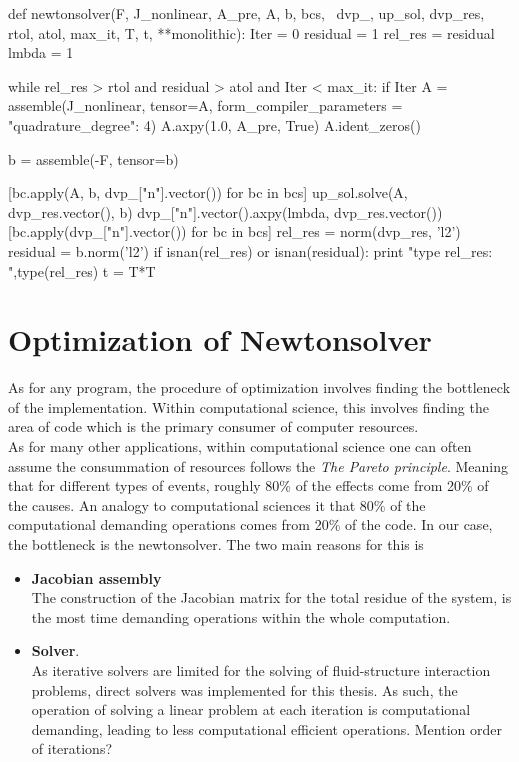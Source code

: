 \begin{python}[caption=newtonsolver.py]
def newtonsolver(F, J_nonlinear, A_pre, A, b, bcs, \
              dvp_, up_sol, dvp_res, rtol, atol, max_it, T, t, **monolithic):
    Iter      = 0
    residual   = 1
    rel_res    = residual
    lmbda = 1

    while rel_res > rtol and residual > atol and Iter < max_it:
        if Iter %
            A = assemble(J_nonlinear, tensor=A, form_compiler_parameters = {"quadrature_degree": 4}) 
            A.axpy(1.0, A_pre, True)
            A.ident_zeros()

        b = assemble(-F, tensor=b)

        [bc.apply(A, b, dvp_["n"].vector()) for bc in bcs]
        up_sol.solve(A, dvp_res.vector(), b)
        dvp_["n"].vector().axpy(lmbda, dvp_res.vector())
        [bc.apply(dvp_["n"].vector()) for bc in bcs]
        rel_res = norm(dvp_res, 'l2')
        residual = b.norm('l2')
        if isnan(rel_res) or isnan(residual):
            print "type rel_res: ",type(rel_res)
            t = T*T

\end{python}
\section{Optimization of Newtonsolver}
As for any program, the procedure of optimization involves finding the bottleneck of the implementation. Within computational science, this involves finding the area of code which is the primary consumer of computer resources. \\
As for many other applications, within computational science one can often assume the consummation of resources follows the \textit{The Pareto principle}. Meaning that for different types of events, roughly 80\% of the effects come from 20\% of the causes. An analogy to computational sciences it that 80\% of the computational demanding operations comes from 20\% of the code. In our case, the bottleneck is the newtonsolver. The two main reasons for this is 

\begin{itemize}
\item \textbf{Jacobian assembly} \\
The construction of the Jacobian matrix for the total residue of the system, is the most time demanding operations within the whole computation. 
\item \textbf{Solver}. \\ 
As iterative solvers are limited for the solving of fluid-structure interaction problems, direct solvers was implemented for this thesis. As such, the operation of solving a linear problem at each iteration is computational demanding, leading to  less computational efficient operations. Mention order of iterations?
\end{itemize}


